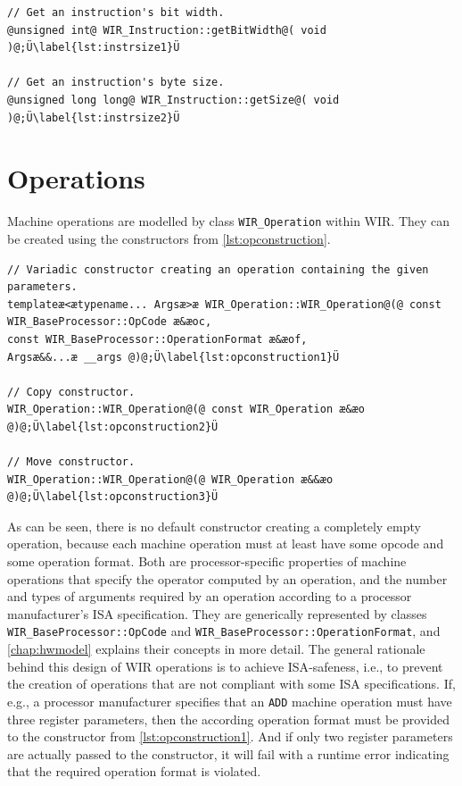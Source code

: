 \begin{lstlisting}[style=code,float=ht,caption={Size Computation by Class \texttt{WIR\_Instruction}},label=lst:instrsize]
// Get an instruction's bit width.
@unsigned int@ WIR_Instruction::getBitWidth@( void )@;Ü\label{lst:instrsize1}Ü

// Get an instruction's byte size.
@unsigned long long@ WIR_Instruction::getSize@( void )@;Ü\label{lst:instrsize2}Ü
\end{lstlisting}


\section{Operations}
\label{sec:operations}

Machine operations are modelled by class \texttt{WIR\_Operation} within \gls{WIR}.
They can be created using the constructors from \cref{lst:opconstruction}.

\begin{lstlisting}[style=code,float=ht,caption={Constructors of Class \texttt{WIR\_Operation}},label=lst:opconstruction]
// Variadic constructor creating an operation containing the given parameters.
templateæ<ætypename... Argsæ>æ WIR_Operation::WIR_Operation@(@ const WIR_BaseProcessor::OpCode æ&æoc,                                                                      const WIR_BaseProcessor::OperationFormat æ&æof,                                                             Argsæ&&...æ __args @)@;Ü\label{lst:opconstruction1}Ü

// Copy constructor.
WIR_Operation::WIR_Operation@(@ const WIR_Operation æ&æo @)@;Ü\label{lst:opconstruction2}Ü

// Move constructor.
WIR_Operation::WIR_Operation@(@ WIR_Operation æ&&æo @)@;Ü\label{lst:opconstruction3}Ü
\end{lstlisting}

As can be seen, there is no default constructor creating a completely empty operation, because each machine operation must at least have some opcode and some operation format.
Both are processor-specific properties of machine operations that specify the operator computed by an operation, and the number and types of arguments required by an operation according to a processor manufacturer's \gls{ISA} specification.
They are generically represented by classes \texttt{WIR\_BaseProcessor::OpCode} and \texttt{WIR\_BaseProcessor::OperationFormat}, and \cref{chap:hwmodel} explains their concepts in more detail.
The general rationale behind this design of \gls{WIR} operations is to achieve \gls{ISA}-safeness, i.e., to prevent the creation of operations that are not compliant with some \gls{ISA} specifications.
If, e.g., a processor manufacturer specifies that an \texttt{ADD} machine operation must have three register parameters, then the according operation format must be provided to the constructor from \cref{lst:opconstruction1}.
And if only two register parameters are actually passed to the constructor, it will fail with a runtime error indicating that the required operation format is violated.

